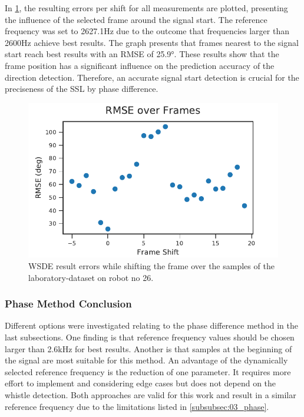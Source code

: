 In \cref{fig:04_phaseOverTime}, the resulting errors per shift
for all measurements are plotted, presenting the influence of the
selected frame around the signal start.
The reference frequency was set to 2627.1\si{\hertz} due to the
outcome that frequencies larger than 2600\si{\hertz} achieve best results.
The graph presents that frames nearest to the signal start reach best results
with an \ac{RMSE} of 25.9\si{\degree}.
These results show that the frame position has a significant influence on the prediction
accuracy of the direction detection.
Therefore, an accurate signal start detection is crucial for the preciseness of the \ac{SSL}
by phase difference.
\begin{figure}[ht]
	\centering
	\includegraphics[]{figures/evaluation/phase_over_time}
	\caption{\ac{WSDE} result errors while shifting the frame over the
		samples of the laboratory-dataset on robot no 26.}
	\label{fig:04_phaseOverTime}
\end{figure}

\subsubsection*{Phase Method Conclusion}
\label{subsubsec:04_phaseMethodConclusion}

Different options were investigated relating to the phase difference method
in the last subsections.
One finding is that reference frequency values should be chosen larger than
2.6\si{\kilo\hertz} for best results.
Another is that samples at the beginning of the signal are most suitable
for this method.
An advantage of the dynamically selected reference frequency is the reduction of
one parameter.
It requires more effort to implement and considering edge cases but
does not depend on the whistle detection.
Both approaches are valid for this work and result in a similar reference
frequency due to the limitations listed in \cref{subsubsec:03_phase}.

